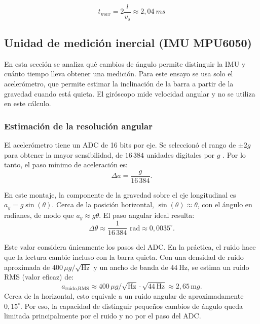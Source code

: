 \documentclass[a4paper, twoside, 10pt, spanish]{article}
\numberwithin{table}{section}
\begin{document}
\begin{equation*}
    t_{max} = 2 \frac{l}{v_s} \approx 2,04 \ ms
\end{equation*}

\subsection{Unidad de medición inercial (IMU MPU6050)}

En esta sección se analiza qué cambios de ángulo permite distinguir la IMU y cuánto tiempo lleva obtener una medición. Para este ensayo se usa solo el acelerómetro, que permite estimar la inclinación de la barra a partir de la gravedad cuando está quieta. El giróscopo mide velocidad angular y no se utiliza en este cálculo.

\subsubsection{Estimación de la resolución angular}

El acelerómetro tiene un ADC de 16 bits por eje. Se seleccionó el rango de $\pm2g$ para obtener la mayor sensibilidad, de $16\,384$ unidades digitales por $g$ \cite{mpu6050}. Por lo tanto, el paso mínimo de aceleración es:
\begin{equation*}
    \Delta a = \frac{g}{16\,384}.
\end{equation*}

En este montaje, la componente de la gravedad sobre el eje longitudinal es $a_y=g\sin(\theta)$. Cerca de la posición horizontal, $\sin(\theta)\approx\theta$, con el ángulo en radianes, de modo que $a_y\approx g\theta$. El paso angular ideal resulta:
\begin{equation*}
    \Delta\theta \approx \frac{1}{16\,384}\text{ rad}
    \approx 0{,}0035^\circ.
\end{equation*}

Este valor considera únicamente los pasos del ADC. En la práctica, el ruido hace que la lectura cambie incluso con la barra quieta. Con una densidad de ruido aproximada de $400\,\mu g/\sqrt{\text{Hz}}$ y un ancho de banda de $\SI{44}{\hertz}$, se estima un ruido RMS (valor eficaz) de:
\begin{equation*}
    a_{\text{ruido,RMS}}\approx
    400\,\mu g/\sqrt{\text{Hz}}\cdot\sqrt{44\,\text{Hz}}
    \approx 2{,}65\,\text{m}g.
\end{equation*}
Cerca de la horizontal, esto equivale a un ruido angular de aproximadamente $0{,}15^\circ$. Por eso, la capacidad de distinguir pequeños cambios de ángulo queda limitada principalmente por el ruido y no por el paso del ADC.
\end{document}
